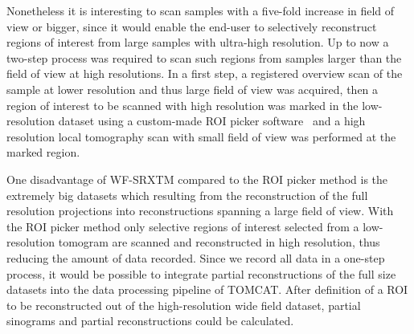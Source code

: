 Nonetheless it is interesting to scan samples with a five-fold increase in field of view or bigger, since it would enable the end-user to selectively reconstruct regions of interest from large samples with ultra-high resolution. Up to now a two-step process was required to scan such regions from samples larger than the field of view at high resolutions. In a first step, a registered overview scan of the sample at lower resolution and thus large field of view was acquired, then a region of interest to be scanned with high resolution was marked in the low-resolution dataset using a custom-made ROI picker software~\cite{Heinzer2008} and a high resolution local tomography scan with small field of view was performed at the marked region.

One disadvantage of WF-SRXTM compared to the ROI picker method is the extremely big datasets which resulting from the reconstruction of the full resolution projections into reconstructions spanning a large field of view. With the ROI picker method only selective regions of interest selected from a low-resolution tomogram are scanned and reconstructed in high resolution, thus reducing the amount of data recorded. Since we record all data in a one-step process, it would be possible to integrate partial reconstructions of the full size datasets into the data processing pipeline of TOMCAT. After definition of a ROI to be reconstructed out of the high-resolution wide field dataset, partial sinograms and partial reconstructions could be calculated.